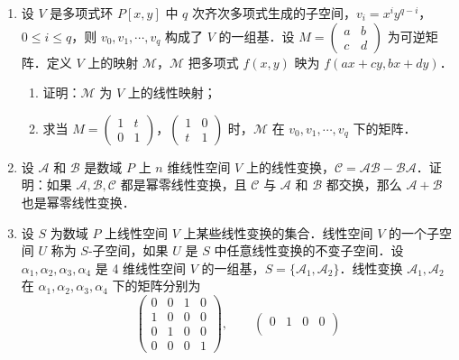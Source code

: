 \begin{enumerate}
\begin{enumerate}
\[      \alpha_4=\begin{pmatrix}0&0\\0&1\end{pmatrix},
    \]
    求 $\mathcal{A}$ 在这组基下的矩阵．
  \anssub
  \end{enumerate}
  \item 设 $V$ 是多项式环 $P[x,y]$ 中 $q$ 次齐次多项式生成的子空间，$v_i=x^iy^{q-i}$，$0\le i\le q$，则 $v_0,v_1,\cdots,v_q$ 构成了 $V$ 的一组基．设 $M=\begin{pmatrix}a&b\\c&d\end{pmatrix}$ 为可逆矩阵．定义 $V$ 上的映射 $\mathcal{M}$，$\mathcal{M}$ 把多项式 $f(x,y)$ 映为 $f(ax+cy,bx+dy)$．
  \begin{enumerate}
    \item 证明：$\mathcal{M}$ 为 $V$ 上的线性映射；
  \anssub
    \item 求当 $M=\begin{pmatrix}1&t\\0&1\end{pmatrix}$，$\begin{pmatrix}1&0\\t&1\end{pmatrix}$ 时，$\mathcal{M}$ 在 $v_0,v_1,\cdots,v_q$ 下的矩阵．
  \anssub
  \end{enumerate}
  \item 设 $\mathcal{A}$ 和 $\mathcal{B}$ 是数域 $P$ 上 $n$ 维线性空间 $V$ 上的线性变换，$\mathcal{C}=\mathcal{A}\mathcal{B}-\mathcal{B}\mathcal{A}$．证明：如果 $\mathcal{A},\mathcal{B},\mathcal{C}$ 都是幂零线性变换，且 $\mathcal{C}$ 与 $\mathcal{A}$ 和 $\mathcal{B}$ 都交换，那么 $\mathcal{A}+\mathcal{B}$ 也是幂零线性变换．
  \ansproof
  \item 设 $S$ 为数域 $P$ 上线性空间 $V$ 上某些线性变换的集合．线性空间 $V$ 的一个子空间 $U$ 称为 $S$-子空间，如果 $U$ 是 $S$ 中任意线性变换的不变子空间．设 $\alpha_1,\alpha_2,\alpha_3,\alpha_4$ 是 4 维线性空间 $V$ 的一组基，$S=\{\mathcal{A}_1,\mathcal{A}_2\}$．线性变换 $\mathcal{A}_1,\mathcal{A}_2$ 在 $\alpha_1,\alpha_2,\alpha_3,\alpha_4$ 下的矩阵分别为
  \[
    \begin{pmatrix}
      0&0&1&0\\
      1&0&0&0\\
      0&1&0&0\\
      0&0&0&1
    \end{pmatrix},
    \qquad
    \begin{pmatrix}
      0&1&0&0\\

\end{pmatrix}\]
\end{enumerate}
